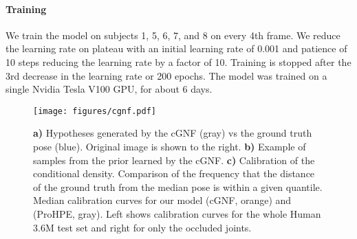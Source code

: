 \documentclass{article} \usepackage{iclr2023_conference,times}
\begin{document}
\paragraph{Training}
We train the model on subjects 1, 5, 6, 7, and 8 on every 4th frame.
We reduce the learning rate on plateau with an initial learning rate of 0.001 and patience of 10 steps reducing the learning rate by a factor of 10.
Training is stopped after the 3rd decrease in the learning rate or 200 epochs.
The model was trained on a single Nvidia Tesla V100 GPU, for about 6 days.

\begin{figure}[t!]
\centering
\texttt{[image: figures/cgnf.pdf]}
\caption{\textbf{a)} Hypotheses generated by the cGNF (gray) vs the ground truth pose (blue). Original image is shown to the right.
\textbf{b)} Example of samples from the prior learned by the cGNF.
\textbf{c)} Calibration of the conditional density. Comparison of the frequency that the distance of the ground truth from the median pose is within a given quantile. Median calibration curves for our model (cGNF, orange) and \citet{Wehrbein_Rudolph_Rosenhahn_Wandt_2021} (ProHPE, gray). Left shows calibration curves for the whole Human 3.6M test set and right for only the occluded joints.
}
\label{fig:fig3}
\end{figure}
\end{document}
